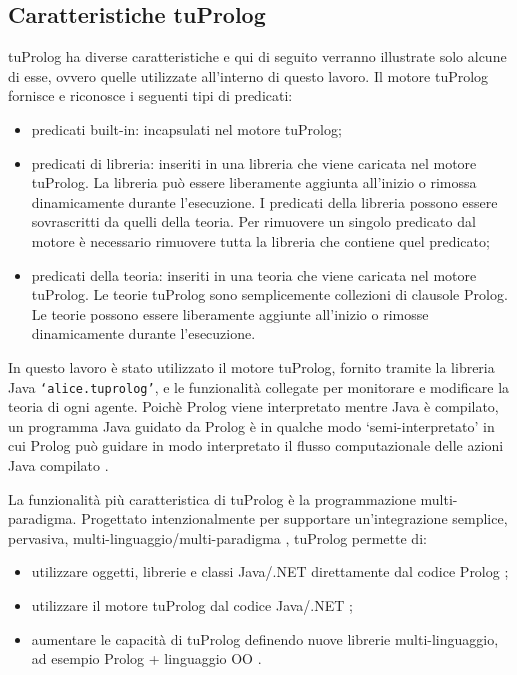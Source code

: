 \subsection{Caratteristiche tuProlog}
tuProlog ha diverse caratteristiche e qui di seguito verranno illustrate solo alcune di esse, ovvero quelle utilizzate all'interno di questo lavoro.
Il motore tuProlog fornisce e riconosce i seguenti tipi di predicati:
\begin{itemize}
\item predicati built-in: incapsulati nel motore tuProlog;
\item predicati di libreria: inseriti in una libreria che viene caricata nel motore tuProlog. La libreria può essere liberamente aggiunta all'inizio o rimossa dinamicamente durante l'esecuzione. I predicati della libreria possono essere sovrascritti da quelli della teoria. Per rimuovere un singolo predicato dal motore è necessario rimuovere tutta la libreria che contiene quel predicato;
\item predicati della teoria: inseriti in una teoria che viene caricata nel motore tuProlog. Le teorie tuProlog sono semplicemente collezioni di clausole Prolog. Le teorie possono essere liberamente aggiunte all'inizio o rimosse dinamicamente durante l'esecuzione.
\end{itemize}

In questo lavoro è stato utilizzato il motore tuProlog, fornito tramite la libreria Java \texttt{`alice.tuprolog’}, e le funzionalità collegate per monitorare e modificare la teoria di ogni agente.
Poichè Prolog viene interpretato mentre Java è compilato, un programma Java guidato da Prolog è in qualche modo `semi-interpretato' in cui Prolog può guidare in modo interpretato il flusso computazionale delle azioni Java compilato \cite{tuprolog-multi-paradigm}.

La funzionalità più caratteristica di tuProlog è la programmazione multi-pa\-ra\-di\-gma.
Progettato intenzionalmente per supportare un'integrazione semplice, pervasiva, multi-linguaggio/multi-paradigma \cite{2p-alpnews2013}, tuProlog permette di:
\begin{itemize}
   \item utilizzare oggetti, librerie e classi Java/.NET direttamente dal codice Prolog \cite{2p-alpnews2013};
   \item utilizzare il motore tuProlog dal codice Java/.NET \cite{2p-alpnews2013};
   \item aumentare le capacità di tuProlog definendo nuove librerie multi-linguaggio, ad esempio Prolog + linguaggio OO \cite{2p-alpnews2013}.
\end{itemize}

